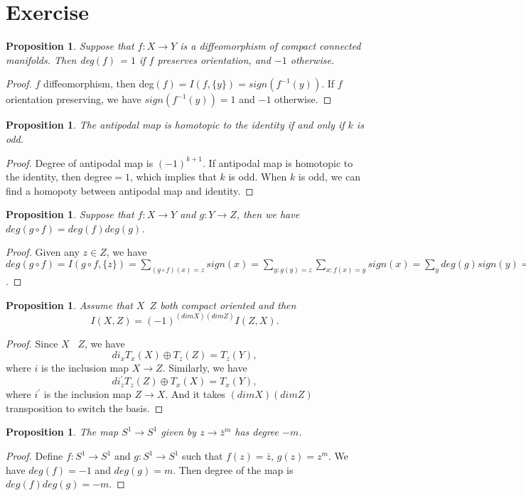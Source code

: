 \documentclass[psamsfonts]{amsart}
\newtheorem{prop}[theorem]{Proposition}
\theoremstyle{definition}
\theoremstyle{remark}
\numberwithin{equation}{section}
\begin{document}
	\section{Exercise}
		\begin{prop}
			Suppose that $f:X \to Y$ is a diffeomorphism of compact connected manifolds. Then deg$(f)$ = $1$ if $f$ preserves orientation, and $-1$ otherwise.
		\end{prop}
		\begin{proof}
			$f$ diffeomorphism, then deg$(f) = I(f,\{y\}) = sign(f^{-1}(y))$. If $f$ orientation preserving, we have $sign(f^{-1}(y)) = 1$ and $-1$ otherwise.
		\end{proof}
		\begin{prop}
			The antipodal map is homotopic to the identity if and only if $k$ is odd.
		\end{prop}
		\begin{proof}
			Degree of antipodal map is $(-1)^{k+1}$. If antipodal map is homotopic to the identity, then degree$=1$, which implies that $k$ is odd. When $k$ is odd, we can find a homopoty between antipodal map and identity.
		\end{proof}
		\begin{prop}
			Suppose that $f: X \to Y$ and $g: Y \to Z$, then we have $deg(g \circ f) = deg(f)deg(g)$.
		\end{prop}
		\begin{proof}
			Given any $z \in Z$, we have $deg(g \circ f) = I(g\circ f, \{z\}) = \sum_{(g \circ f)(x) = z} sign(x) = \sum_{y:g(y)=z} \sum_{x:f(x)=y}sign(x) = \sum_{y}deg(g)sign(y) = deg(f)deg(g)$.
		\end{proof}
		\begin{prop}
			Assume that $X$\;\;\makebox[0pt]{$\top$}\makebox[0pt]{$\cap$}\;\ $Z$ both compact oriented and then 
			\begin{equation}
				I(X,Z) = (-1)^{(dim X)(dim Z)}I(Z,X).
			\end{equation}
		\end{prop}
		\begin{proof}
			Since $X$ \;\;\makebox[0pt]{$\top$}\makebox[0pt]{$\cap$}\;\ $Z$, we have
			\begin{equation}
				di_xT_x(X) \oplus T_z(Z) = T_z(Y),
			\end{equation}
			where $i$ is the inclusion map $X \to Z$. Similarly, we have 
			\begin{equation}
				di^{\prime}_zT_z(Z) \oplus T_x(X) = T_x(Y),
			\end{equation}
			where $i^\prime$ is the inclusion map $Z \to X$. And it takes $(dim X)(dim Z)$ transposition to switch the basis.
		\end{proof}
		\begin{prop}
			The map $S^1 \to S^1$ given by $z \to \bar{z}^m$ has degree $-m$.
		\end{prop}
		\begin{proof}
			Define $f: S^1 \to S^1$ and $g: S^1 \to S^1$ such that $f(z) = \bar{z}$, $g(z) = z^m$. We have $deg(f) = -1$ and $deg(g) = m$. Then degree of the map is $deg(f)deg(g) = -m$.
		\end{proof}
\end{document}
